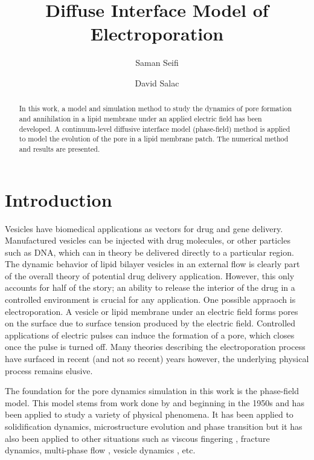 \documentclass[english,12pt]{article}
\begin{document}
\title{Diffuse Interface Model of Electroporation}

\author{Saman Seifi}
\author{David Salac}

\date{}

\maketitle

\begin{abstract}
In this work, a model and simulation method to study the dynamics of pore formation and annihilation in a lipid membrane under an applied electric field has been developed. A continuum-level diffusive interface model (phase-field) method is applied to model the evolution of the pore in a lipid membrane patch. The numerical method and results are presented.	
\end{abstract}


\section{Introduction}

Vesicles have biomedical applications as vectors for drug and gene delivery. Manufactured vesicles can be injected with drug molecules, or other particles such as DNA, which can in theory be delivered directly to a particular region.
    The dynamic behavior of lipid bilayer vesicles in an external flow is clearly part of the overall theory of potential drug delivery application.
However, this only accounts for half of the story; an ability to release the interior
of the drug in a controlled environment is crucial for any application. 
     One possible appraoch is electroporation. A vesicle or lipid membrane under an electric field forms pores on the surface due to surface tension produced by the electric field. Controlled applications of electric pulses can induce the formation of a pore, which closes once the pulse is turned off.
     Many theories describing the electroporation process have surfaced in recent (and not so recent) years \citep{Weaver1996135,Zimmermann1974881,DeBruin19991213} however, the underlying physical process remains elusive.
     
The foundation for the pore dynamics simulation in this work is the phase-field model. This model stems from work done by \citep{landau1950theory,Cahn1971151} and \citep{Allen19791085} beginning in the 1950s and has been applied to study a variety of physical phenomena. It has been applied to solidification dynamics, microstructure evolution and phase transition but it has also been applied to other situations such as viscous fingering \citep{PhysRevE.61.6632,PhysRevE.68.046310}, fracture dynamics,\cite{PhysRevLett.87.045501} multi-phase flow \cite{Steinbach1996135,Badalassi2003371}, vesicle dynamics \cite{Du2004450,PhysRevE.79.031926}, etc.
\end{document}
